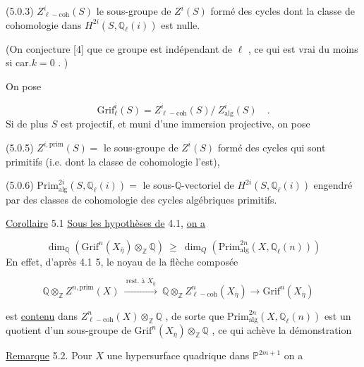 (5.0.3)   $Z^i_{\ell-\mathrm{coh}}(S)$  le sous-groupe de  $Z^i(S)$  formé des cycles dont la classe de cohomologie dans  $H^{2i}(S,\mathbb{Q}_\ell(i))$  est nulle.

(On conjecture [4] que ce groupe est indépendant de  $\ell$  , ce qui est vrai du moins si  car.$k=0$ . )

On pose

\begin{equation}\tag{5.0.4}
\mathrm{Grif}^i_\ell(S) = Z^i_{\ell-\mathrm{coh}}(S)/\ Z^i_{\mathrm{alg}}(S) \quad .
\end{equation}
Si de plus  $S$  est projectif, et muni d'une immersion projective, on pose

(5.0.5)   $Z^{i,\mathrm{prim}}(S) =$ le sous-groupe de  $Z^i(S)$  formé des cycles qui sont primitifs (i.e. dont la classe de cohomologie l'est),

(5.0.6)   $\mathrm{Prim}^{2i}_{\mathrm{alg}}(S,\mathbb{Q}_\ell(i)) =$ le sous-$\mathbb{Q}$-vectoriel de  $H^{2i}(S,\mathbb{Q}_\ell(i))$ engendré par des classes de cohomologie des cycles algébriques primitifs.

\underline{Corollaire} 5.1    \underline{Sous les hypothèses de}  4.1, \underline{on a}

\begin{equation}\tag{5.1.1,}
\dim_{\mathbb{Q}}(\mathrm{Grif}^n(X_{\overline{\eta}})\otimes_{\mathbb{Z}}\mathbb{Q}) \ \geq \ \dim_Q(\mathrm{Prim}^{2n}_{\mathrm{alg}}(X,\mathbb{Q}_\ell(n)))
\end{equation}
En effet, d'après 4.1 5, le noyau de la flèche composée

\begin{equation*}
\mathbb{Q}\otimes_{\mathbb{Z}}Z^{n,\mathrm{prim}}(X) \ \xrightarrow{\ \text{rest. à } X_{\overline{\eta}}\ }\ \mathbb{Q} \otimes_{\mathbb{Z}}Z^n_{\ell-\mathrm{coh}}(X_{\overline{\eta}}) \longrightarrow \mathrm{Grif}^n(X_{\overline{\eta}}) \quad 
\end{equation*}


 est \underline{contenu} dans $Z^n_{\ell-\mathrm{coh}}(X) \otimes_{\mathbb{Z}} \mathbb{Q}$ , de sorte que $\mathrm{Prim}^{2n}_{\mathrm{alg}}(X,\mathbb{Q}_{\ell}(n))$ est un quotient d'un sous-groupe de $\mathrm{Grif}^n(X_{\overline{\eta}}) \otimes_{\mathbb{Z}} \mathbb{Q}$ , ce qui achève la démonstration

\underline{Remarque} 5.2.  Pour $X$ une hypersurface quadrique dans $\mathbb{P}^{2m+1}$ on a

